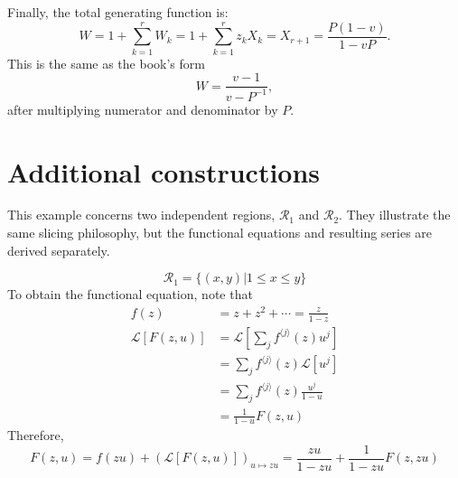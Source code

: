 Finally, the total generating function is:
\begin{equation} \label{eq:III.19.6}
    W = 1 + \sum_{k = 1}^{r} W_{k} = 1 + \sum_{k = 1}^{r} z_{k}X_{k} = X_{r + 1} = \frac{P(1 - v)}{1 - vP}.
\end{equation}
This is the same as the book's form
\begin{equation*}
    W = \frac{v - 1}{v - P^{-1}},
\end{equation*}
after multiplying numerator and denominator by $P$.

\section{Additional constructions}

This example concerns two independent regions, $\mathcal{R}_{1}$ and $\mathcal{R}_{2}$. They illustrate the same slicing philosophy, but the functional equations and resulting series are derived separately.

\begin{equation*}
    \mathcal{R}_{1} = \{(x, y)|1 \leq x \leq y\}
\end{equation*}
To obtain the functional equation, note that
\begin{equation*}
    \begin{aligned}
        f(z) &= z + z^{2} + \cdots = \frac{z}{1 - z} \\
        \mathcal{L}[F(z, u)]
            &= \mathcal{L}[\sum_{j} f^{\langle j \rangle}(z)u^{j}] \\
            &= \sum_{j} f^{\langle j \rangle}(z)\mathcal{L}[u^{j}] \\
            &= \sum_{j} f^{\langle j \rangle}(z)\frac{u^{j}}{1 - u} \\
            &= \frac{1}{1 - u} F(z, u)
    \end{aligned}
\end{equation*}
Therefore,
\begin{equation} \label{eq:III.22.3}
    F(z, u) = f(zu) + (\mathcal{L}[F(z, u)])_{u \mapsto zu} = \frac{zu}{1 - zu} + \frac{1}{1 - zu} F(z, zu)
\end{equation}

